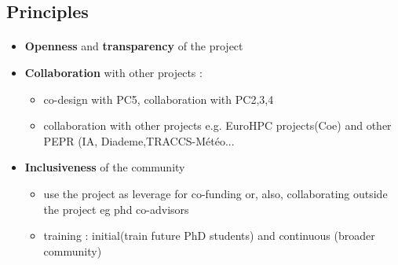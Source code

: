\subsection{Principles}
\begin{frame}[fragile=singleslide]{\insertsectionhead}
  \framesubtitle{\insertsubsectionhead}

  \begin{itemize}
    \item \textbf{Openness} and \textbf{transparency} of the project 
    \item \textbf{Collaboration} with other projects : 
    \begin{itemize}
      \item 
        co-design with PC5, collaboration with PC2,3,4\
        \item 
          collaboration with other projects e.g. EuroHPC projects(Coe) and other PEPR (IA, Diademe,TRACCS-Météo...
    \end{itemize}
    \item \textbf{Inclusiveness} of the community 
    \begin{itemize}
      \item use the project as leverage for co-funding  or, also, collaborating outside the project eg phd co-advisors
      \item training : initial(train future PhD students) and continuous (broader community)
    \end{itemize}      
  \end{itemize}

\end{frame}

